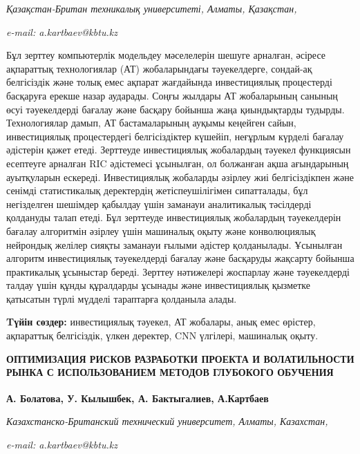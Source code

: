 \begin{affiliation}
\emph{Қазақстан-Британ техникалық университеті, Алматы, Қазақстан,}

\emph{e-mail: a.kartbaev@kbtu.kz}
\end{affiliation}

Бұл зерттеу компьютерлік модельдеу мәселелерін шешуге арналған, әсіресе
ақпараттық технологиялар (АТ) жобаларындағы тәуекелдерге, сондай-ақ
белгісіздік және толық емес ақпарат жағдайында инвестициялық процестерді
басқаруға ерекше назар аударады. Соңғы жылдары АТ жобаларының санының
өсуі тәуекелдерді бағалау және басқару бойынша жаңа қиындықтарды
тудырды. Технологиялар дамып, АТ бастамаларының ауқымы кеңейген сайын,
инвестициялық процестердегі белгісіздіктер күшейіп, неғұрлым күрделі
бағалау әдістерін қажет етеді. Зерттеуде инвестициялық жобалардың
тәуекел функциясын есептеуге арналған RIC әдістемесі ұсынылған, ол
болжанған ақша ағындарының ауытқуларын ескереді. Инвестициялық жобаларды
әзірлеу жиі белгісіздікпен және сенімді статистикалық деректердің
жетіспеушілігімен сипатталады, бұл негізделген шешімдер қабылдау үшін
заманауи аналитикалық тәсілдерді қолдануды талап етеді. Бұл зерттеуде
инвестициялық жобалардың тәуекелдерін бағалау алгоритмін әзірлеу үшін
машиналық оқыту және конволюциялық нейрондық желілер сияқты заманауи
ғылыми әдістер қолданылады. Ұсынылған алгоритм инвестициялық
тәуекелдерді бағалау және басқаруды жақсарту бойынша практикалық
ұсыныстар береді. Зерттеу нәтижелері жоспарлау және тәуекелдерді талдау
үшін құнды құралдарды ұсынады және инвестициялық қызметке қатысатын
түрлі мүдделі тараптарға қолданыла алады.

{\bfseries Tүйін сөздер:} инвестициялық тәуекел, АТ жобалары, анық емес
өрістер, ақпараттық белгісіздік, үлкен деректер, CNN үлгілері, машиналық
оқыту.

\begin{articleheader}
{\bfseries ОПТИМИЗАЦИЯ РИСКОВ РАЗРАБОТКИ ПРОЕКТА И ВОЛАТИЛЬНОСТИ РЫНКА С ИСПОЛЬЗОВАНИЕМ МЕТОДОВ ГЛУБОКОГО ОБУЧЕНИЯ}

{\bfseries
А. Болатова,
У. Кылышбек,
А. Бактыгалиев,
А.Картбаев\textsuperscript{\envelope }}
\end{articleheader}

\begin{affiliation}
\emph{Казахстанско-Британский технический университет, Алматы,
Казахстан,}

\emph{e-mail: a.kartbaev@kbtu.kz}
\end{affiliation}

